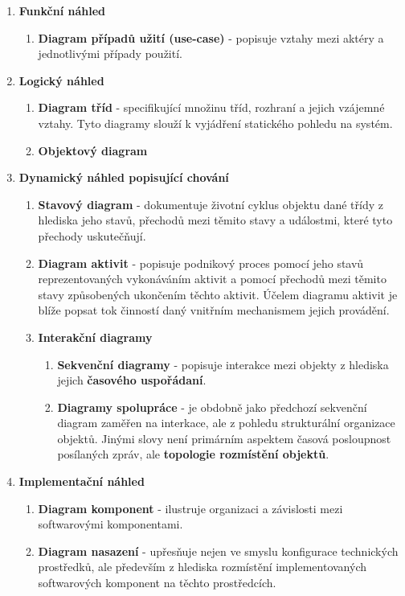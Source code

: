 \begin{enumerate}
	\item \textbf{Funkční náhled}
	\begin{enumerate}
		\item \textbf{Diagram případů užití (use-case)} - popisuje vztahy mezi aktéry a jednotlivými případy použití. 
	\end{enumerate}
	\item \textbf{Logický náhled}
	\begin{enumerate}
		\item \textbf{Diagram tříd} - specifikující množinu tříd, rozhraní a jejich vzájemné vztahy. Tyto diagramy slouží k vyjádření statického pohledu na systém.
		\item \textbf{Objektový diagram}
	\end{enumerate}
	\item \textbf{Dynamický náhled popisující chování}
	\begin{enumerate}
		\item \textbf{Stavový diagram} - dokumentuje životní cyklus objektu dané třídy z hlediska jeho stavů, přechodů mezi těmito stavy a událostmi, které tyto přechody uskutečňují. 
		\item \textbf{Diagram aktivit} -  popisuje podnikový proces pomocí jeho stavů reprezentovaných vykonáváním aktivit a pomocí přechodů mezi těmito stavy způsobených ukončením těchto aktivit. Účelem diagramu aktivit je blíže popsat tok činností daný vnitřním mechanismem jejich provádění. 
		\item \textbf{Interakční diagramy}
		\begin{enumerate}
			\item \textbf{Sekvenční diagramy} -  popisuje interakce mezi objekty z hlediska jejich \textbf{časového uspořádaní}.
			\item \textbf{Diagramy spolupráce} -  je obdobně jako předchozí sekvenční diagram zaměřen na interkace, ale z pohledu strukturální organizace objektů. Jinými slovy není primárním aspektem časová posloupnost posílaných zpráv, ale \textbf{topologie rozmístění objektů}. 
		\end{enumerate}
	\end{enumerate}
	\item \textbf{Implementační náhled}
	\begin{enumerate}
		\item \textbf{Diagram komponent} - ilustruje organizaci a závislosti mezi softwarovými komponentami. 
		\item \textbf{Diagram nasazení} - upřesňuje nejen ve smyslu konfigurace technických prostředků, ale především z hlediska rozmístění implementovaných softwarových komponent na těchto prostředcích.
	\end{enumerate}
\end{enumerate}


